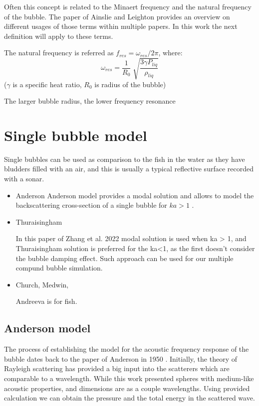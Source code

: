Often this concept is related to the Minaert frequency and the natural frequency of the bubble. The paper of Ainslie and Leighton \cite[]{ainslie_review_2011} provides an overview on different usages of those terms within multiple papers. In this work the next definition will apply to these terms. 

The natural frequency is referred as $f_{res}=\omega_{res}/2\pi$, where:
\begin{equation}
    \omega_{res}=\frac{1}{R_0}\sqrt[]{\frac{3\gamma P_{liq}}{\rho_{liq}}}
    \label{eqn:minnaert_freq}
\end{equation}
($\gamma$ is a specific heat ratio, 
$R_0$ is radius of the bubble)

The larger bubble radius, the lower frequency resonance

\section{Single bubble model}

Single bubbles can be used as comparison to the fish in the water as they have bludders filled with an air, and this is usually a typical reflective surface recorded with a sonar.

\begin{itemize}
    \item Anderson
    Anderson model provides a modal solution and allows to model the backscattering cross-section of a single bubble for $ka > 1$ \cite{anderson_sound_2005}.

    \item Thuraisingham

    In this paper of Zhang et al. 2022 \cite{zhang_efficient_2022} modal solution is used when ka > 1, and Thuraisingham solution is preferred for the ka<1, as the first doesn't consider the bubble damping effect.  Such approach can be used for our multiple compund bubble simulation.

    \item Church, Medwin,

    Andreeva is for fish.

\end{itemize}

\subsection{Anderson model}
The process of establishing the model for the acoustic frequency response of the bubble dates back to the paper of Anderson in 1950 \cite{anderson_sound_2005}. Initially, the theory of Rayleigh scattering has provided a big input into the scatterers which are comparable to a wavelength. While this work presented spheres with medium-like acoustic properties, and dimensions are as a couple  wavelengths. Using provided calculation we can obtain the pressure and the total energy in the scattered wave.

